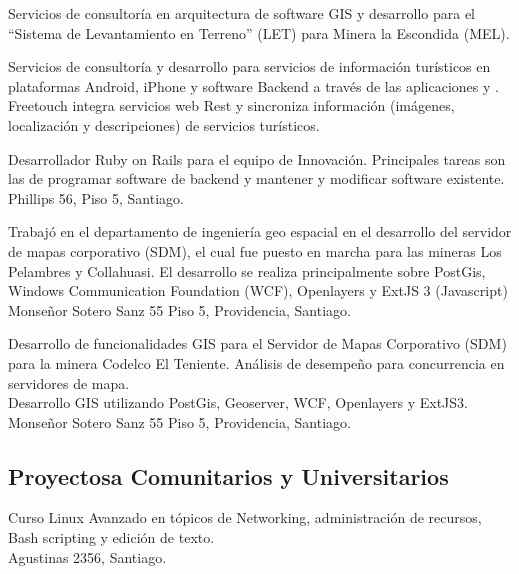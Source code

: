 \documentclass[11pt,letterpaper,roman]{moderncv}
\begin{document}
 {\scd} {\jobbitgames} {\stgo} {}
{Servicios de consultoría en arquitectura de software GIS y desarrollo para el
``Sistema de Levantamiento en Terreno'' (LET) para Minera la Escondida (MEL).}


 {\scd} {\mataveri} {\stgo} {}
{Servicios de consultoría y desarrollo para servicios de información turísticos en
plataformas Android, iPhone y software Backend a través de las aplicaciones
\freetouchchile y \freetouchperu. Freetouch integra servicios web Rest y
sincroniza información (imágenes, localización y descripciones) de servicios
turísticos.}

 {\se} {\multicaja} {\stgo} {}
{Desarrollador Ruby on Rails para el equipo de Innovación. Principales tareas
son las de programar software de backend y mantener y modificar software
existente. \\ Phillips 56, Piso 5, Santiago.}


 {\sd} {\ikom} {\stgo} {}
{Trabajó en el departamento de ingeniería geo espacial en el desarrollo del
servidor de mapas corporativo (SDM), el cual fue puesto en marcha para las
mineras Los Pelambres y Collahuasi. El desarrollo se realiza principalmente
sobre PostGis, Windows Communication Foundation (WCF), Openlayers y ExtJS 3
(Javascript) \\ Monseñor Sotero Sanz 55 Piso 5, Providencia, Santiago.} 


  {\intership} {\ikom} {\stgo} {}
{Desarrollo de funcionalidades GIS para el Servidor de Mapas Corporativo (SDM)
para la minera Codelco El Teniente. Análisis de desempeño para concurrencia en
servidores de mapa. \\ Desarrollo GIS utilizando PostGis, Geoserver, WCF,
Openlayers y ExtJS3. \\ Monseñor Sotero Sanz 55 Piso 5, Providencia, Santiago.}

	
\subsection{Proyectosa Comunitarios y Universitarios}
	

 {\tchr} {\ipgamma} {\stgo} {}
{Curso \sence Linux Avanzado en tópicos de Networking, administración de
recursos, Bash scripting y edición de texto. \\ Agustinas 2356, Santiago.}
\end{document}
